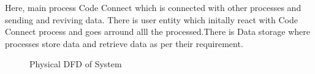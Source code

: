 Here, main process Code Connect which is connected with other processes and sending and reviving data. There is user entity which initally react with Code Connect process and goes arround alll the processed.There is Data storage where processes store data and retrieve data as per their requirement.

\begin{figure}[H]
  \caption{Physical DFD of System}
\end{figure}
\newpage
